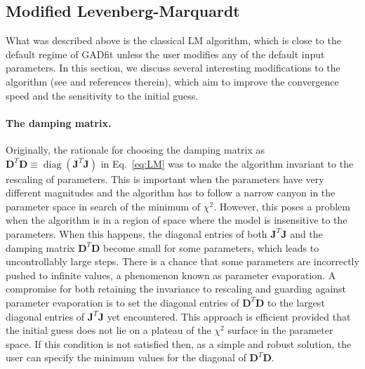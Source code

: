 \documentclass{article}
\DeclareMathOperator{\diag}{diag}
\begin{document}
\subsection{\label{sec:mod_lm}Modified Levenberg-Marquardt}

What was described above is the classical LM algorithm, which is close to the default regime of GADfit unless the user modifies any of the default input parameters. In this section, we discuss several interesting modifications to the algorithm (see \cite{transtrum10, transtrum11, transtrum12} and references therein), which aim to improve the convergence speed and the sensitivity to the initial guess.

\paragraph{The damping matrix.} Originally, the rationale for choosing the damping matrix as $\bm D^T\bm D \equiv \diag(\bm J^T\bm J)$ in Eq.~\eqref{eq:LM} was to make the algorithm invariant to the rescaling of parameters. This is important when the parameters have very different magnitudes and the algorithm has to follow a narrow canyon in the parameter space in search of the minimum of $\chi^2$. However, this poses a problem when the algorithm is in a region of space where the model is insensitive to the parameters. When this happens, the diagonal entries of both $\bm J^T\bm J$ and the damping matrix $\bm D^T\bm D$ become small for some parameters, which leads to uncontrollably large steps. There is a chance that some parameters are incorrectly pushed to infinite values, a phenomenon known as parameter evaporation. A compromise for both retaining the invariance to rescaling and guarding against parameter evaporation is to set the diagonal entries of $\bm D^T\bm D$ to the largest diagonal entries of $\bm J^T\bm J$ yet encountered. This approach is efficient provided that the initial guess does not lie on a plateau of the $\chi^2$ surface in the parameter space. If this condition is not satisfied then, as a simple and robust solution, the user can specify the minimum values for the diagonal of $\bm D^T\bm D$.
\end{document}
